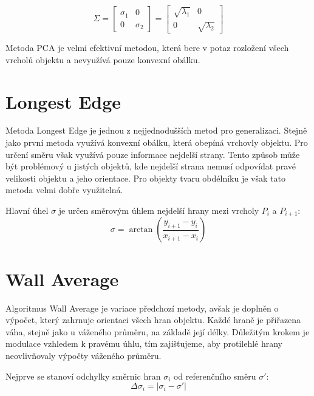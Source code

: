 \documentclass[12pt, a4paper]{article}
\begin{document}
$$\Sigma=\begin{bmatrix} \sigma_1 & 0 \\ 0 & \sigma_2 \end{bmatrix}=
\begin{bmatrix} \sqrt{\lambda_1} & 0 \\ 0 & \sqrt{\lambda_2} \end{bmatrix}$$
\vspace{1cm}

\noindent Metoda PCA je velmi efektivní metodou, která bere v potaz rozložení všech vrcholů objektu a nevyužívá pouze konvexní obálku.
\vspace{1cm}

\newpage
\section {Longest Edge}

\vspace{1cm}
Metoda Longest Edge je jednou z nejjednodušších metod pro generalizaci. Stejně jako první metoda využívá konvexní obálku, která obepíná vrchovly objektu. Pro určení směru však využívá pouze informace nejdelší strany. Tento způsob může být problémový u jistých objektů, kde nejdelší strana nemusí odpovídat pravé velikosti objektu a jeho orientace. Pro objekty tvaru obdélníku je však tato metoda velmi dobře využitelná. 

\vspace{1cm}
\noindent Hlavní úhel $\sigma$ je určen směrovým úhlem nejdelší hrany mezi vrcholy $P_i$ a $P_{i+1}$:
\vspace{1cm}
$$\sigma = \arctan \left( \frac{y_{i+1} - y_i}{x_{i+1} - x_i} \right)$$
\vspace{1cm}

\newpage
\section {Wall Average}

\vspace{1cm}
Algoritmus Wall Average je variace předchozí metody, avšak je doplněn o výpočet, který zahrnuje orientaci všech hran objektu. Každé hraně je přiřazena váha, stejně jako u váženého průměru, na základě její délky. Důležitým krokem je modulace vzhledem k pravému úhlu, tím zajišťujeme, aby protilehlé hrany neovlivňovaly výpočty váženého průměru. 

\vspace{1cm}
\noindent Nejprve se stanoví odchylky směrnic hran $\sigma_i$ od referenčního směru $\sigma'$:
\vspace{1cm}
$$ \Delta\sigma_i = |\sigma_i - \sigma'| $$
\vspace{1cm}
\end{document}
